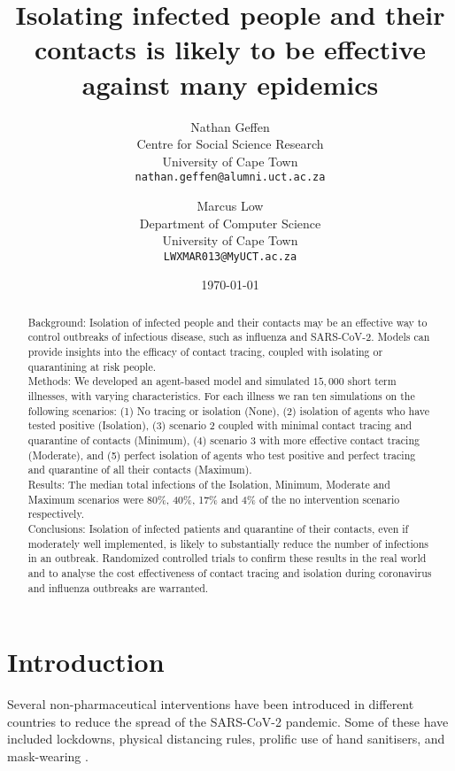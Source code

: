 \documentclass{article}
\title{Isolating infected people and their contacts is likely to be effective
against many epidemics}
\author{
  Nathan Geffen \\
  Centre for Social Science Research\\
  University of Cape Town\\
  \texttt{nathan.geffen@alumni.uct.ac.za} \\
  \and
  Marcus Low\\
  Department of Computer Science\\
  University of Cape Town\\
  \texttt{LWXMAR013@MyUCT.ac.za}}
\date{\today}
\begin{document}
\maketitle

\begin{abstract}

  Background: Isolation of infected people and their contacts may be an
  effective way to control outbreaks of infectious disease, such as influenza
  and SARS-CoV-2. Models can provide insights into the efficacy of contact
  tracing, coupled with isolating or quarantining at risk people.\\
  Methods: We developed an agent-based model and simulated $15,000$ short term
  illnesses, with varying characteristics. For
  each illness we ran ten simulations on the following scenarios: (1) No
  tracing or isolation (None), (2) isolation of agents who have tested positive
  (Isolation), (3) scenario 2 coupled with minimal contact tracing and quarantine
  of contacts (Minimum), (4) scenario 3 with more effective contact tracing
  (Moderate), and (5) perfect isolation of agents who test positive and perfect
  tracing and quarantine of all their contacts (Maximum).\\
  Results: The median total infections of the Isolation, Minimum, Moderate and
  Maximum scenarios were 80\%, 40\%, 17\% and 4\% of the no intervention
  scenario respectively.\\
  Conclusions: Isolation of infected patients and quarantine of their contacts,
  even if moderately well implemented, is likely to substantially reduce the
  number of infections in an outbreak. Randomized controlled trials to confirm
  these results in the real world and to analyse the cost effectiveness of
  contact tracing and isolation during coronavirus and influenza outbreaks are
  warranted.

\end{abstract}


\section{Introduction}

Several non-pharmaceutical interventions have been introduced in different
countries to reduce the spread of the SARS-CoV-2 pandemic. Some of these have
included lockdowns, physical distancing rules, prolific use of hand sanitisers,
and mask-wearing \cite{Flaxman2020,Lemaitre2020,Cowling2020}.
\end{document}
